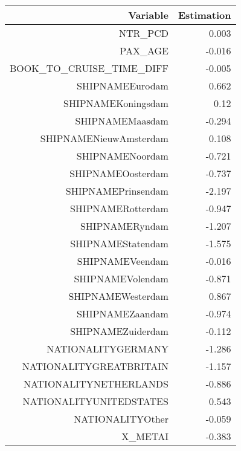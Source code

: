 \documentclass{article}
\begin{document}
\begin{table}[H]
	\centering 
	\begin{tabular}{rr}
	Variable & Estimation \\
	\hline 
	\hline 
	NTR\_PCD	                   &              0.003       \\           
	PAX\_AGE	                   &             -0.016       \\           
	BOOK\_TO\_CRUISE\_TIME\_DIFF   &              -0.005      \\            
	SHIPNAMEEurodam	           &           0.662          \\        
	SHIPNAMEKoningsdam	   &            0.12          \\        
	SHIPNAMEMaasdam	           &          -0.294          \\        
	SHIPNAMENieuwAmsterdam	   &          0.108           \\       
	SHIPNAMENoordam	           &         -0.721           \\       
	SHIPNAMEOosterdam	   &      -0.737              \\    
	SHIPNAMEPrinsendam	   &      -2.197              \\    
	SHIPNAMERotterdam	   &      -0.947              \\    
	SHIPNAMERyndam	           &       -1.207             \\     
	SHIPNAMEStatendam	   &      -1.575              \\    
	SHIPNAMEVeendam	           &      -0.016              \\    
	SHIPNAMEVolendam	   &      -0.871              \\    
	SHIPNAMEWesterdam	   &      0.867               \\   
	SHIPNAMEZaandam	           &      -0.974              \\    
	SHIPNAMEZuiderdam	   &      -0.112              \\    
	NATIONALITYGERMANY         &          -1.286          \\        
	NATIONALITYGREATBRITAIN	   &          -1.157          \\        
	NATIONALITYNETHERLANDS	   &           -0.886         \\         
	NATIONALITYUNITEDSTATES	   &            0.543         \\         
	NATIONALITYOther	   &          -0.059          \\        
	X\_METAI	                   &           -0.383         \\         

\end{tabular}
\end{table}
\end{document}
